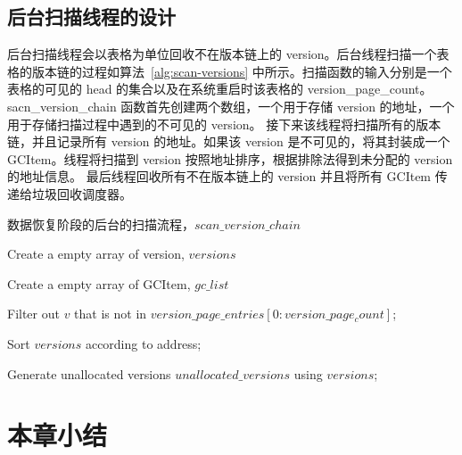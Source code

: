 \subsection{后台扫描线程的设计}
\label{ssec:background-scan}

后台扫描线程会以表格为单位回收不在版本链上的 version。后台线程扫描一个表格的版本链的过程如算法~\ref{alg:scan-versions} 中所示。扫描函数的输入分别是一个表格的可见的 head 的集合以及在系统重启时该表格的 version\_page\_count。sacn\_version\_chain 函数首先创建两个数组，一个用于存储 version 的地址，一个用于存储扫描过程中遇到的不可见的 version。
接下来该线程将扫描所有的版本链，并且记录所有 version 的地址。如果该 version 是不可见的，将其封装成一个 GCItem。线程将扫描到 version 按照地址排序，根据排除法得到未分配的 version 的地址信息。
最后线程回收所有不在版本链上的 version 并且将所有 GCItem 传递给垃圾回收调度器。


\begin{algorithm}[ht]
    \caption{数据恢复阶段的后台的扫描流程，$scan\_version\_chain$}
    \label{alg:scan-versions}
    \BlankLine

    Create a empty array of version, $versions$

    Create a empty array of GCItem, $gc\_list$


    Filter out $v$ that is not in $version\_page\_entries[0:version\_page_count]$;

    Sort $versions$ according to address;


    Generate unallocated versions $unallocated\_versions$ using $versions$;



\end{algorithm}

\section{本章小结}

